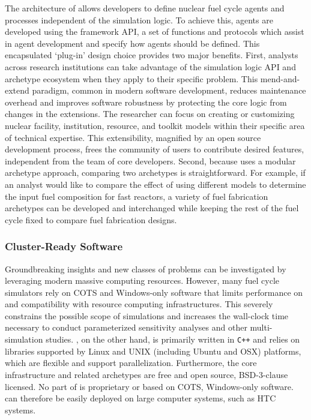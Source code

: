 The architecture of \Cyclus allows developers
to define nuclear fuel cycle agents and processes independent of the simulation
logic. To achieve this, agents are developed using the \Cyclus framework \gls{API}, a set of functions and protocols
which
assist in agent development and specify how agents should be defined.
This encapsulated `plug-in'
design choice provides two major benefits. First, analysts across research institutions can take advantage of the
simulation logic \gls{API} and archetype ecosystem when they apply \Cyclus to
their specific problem. This
mend-and-extend paradigm, common in modern software development, reduces
maintenance overhead and improves software robustness by protecting the core logic
from changes in the extensions.
The researcher can focus on creating or customizing nuclear
facility, institution, resource, and toolkit models within their specific area
of technical expertise. This extensibility, magnified by an open source
development process, frees the community of users to contribute desired
features, independent from the team of \Cyclus core developers.
Second, because \Cyclus uses a modular archetype approach, comparing two
archetypes is straightforward. For example, if an analyst would like
to compare the effect of using different models to determine the input fuel
composition for fast reactors, a variety of fuel fabrication archetypes can be
developed and interchanged while keeping the rest of the fuel cycle fixed
 to compare fuel fabrication designs.

\subsubsection{Cluster-Ready Software}

Groundbreaking insights and new classes of problems can be investigated by
leveraging modern massive computing resources.
However, many fuel cycle simulators rely on \gls{COTS} and Windows-only software that limits
performance on and compatibility with resource computing infrastructures. This
severely constrains the possible scope of simulations and increases the wall-clock time necessary to conduct parameterized sensitivity
analyses and other multi-simulation studies. \Cyclus, on the other hand, is
primarily written in \texttt{C++} and relies on
libraries supported by Linux and UNIX (including Ubuntu and OSX) platforms,
which are flexible and support parallelization.
Furthermore, the core infrastructure and related archetypes are free and
open source, BSD-3-clause licensed. No part of \Cyclus is proprietary or based
on \gls{COTS}, Windows-only software. \Cyclus can therefore be easily deployed
on large computer systems, such as \gls{HTC} systems.

